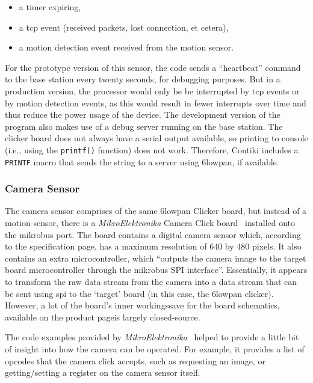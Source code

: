 \begin{itemize}
  \item a timer expiring,
  \item a \acrshort{tcp} event (received packets, lost connection, et cetera),
  \item a motion detection event received from the motion sensor.
\end{itemize}

For the prototype version of this sensor, the code sends a ``heartbeat''
command to the base station every twenty seconds, for debugging purposes. But
in a production version, the processor would only be be interrupted by
\acrshort{tcp} events or by motion detection events, as this would result in
fewer interrupts over time and thus reduce the power usage of the device. The
development version of the program also makes use of a debug server running
on the base station. The clicker board does not always have a serial
output available, so printing to console (i.e., using the \texttt{printf()}
function) does not work. Therefore, Contiki includes a \texttt{PRINTF} macro
that sends the string to a server using \gls{6lowpan}, if available.

\subsubsection{Camera Sensor}

The camera sensor comprises of the same \gls{6lowpan} Clicker board, but
instead of a motion sensor, there is a \textit{MikroElektronika} Camera Click
board~\cite{cameraclick} installed onto the \gls{mikrobus} port. The board
contains a digital camera sensor which, according to the specification page,
has a maximum resolution of 640 by 480 pixels. It also contains an extra
microcontroller, which ``outputs the camera image to the target board
microcontroller through the \gls{mikrobus} SPI interface''. Essentially, it
appears to transform the raw data stream from the camera into a data stream
that can be sent using \acrfull{spi} to the `target' board (in this case, the
\gls{6lowpan} clicker). However, a lot of the board's inner
workings\textemdash save for the board schematics, available on the product
page\textemdash is largely closed-source.

The code examples provided by
\textit{MikroElektronika}~\cite{cameraclickexamples} helped to provide a
little bit of insight into how the camera can be operated. For example, it
provides a list of \glspl{opcode} that the camera click accepts, such as
requesting an image, or getting/setting a register on the camera sensor
itself.

